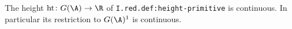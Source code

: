 The height $\operatorname{ht}\colon G(\A)\to\R$ of \texttt{I.red.def:height-primitive} is continuous. In particular its restriction to $G(\A)^1$
is continuous.
